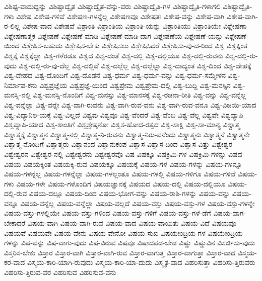 {ವಿಶಿಷ್ಟ-ವಾದುದ್ದನ್ನು
ವಿಶಿಷ್ಟಾದ್ವೈತ
ವಿಶಿಷ್ಟಾದ್ವೈತ-ವೆನ್ನು-ವರು
ವಿಶಿಷ್ಟಾದ್ವೈತಿ-ಗಳ
ವಿಶಿಷ್ಟಾದ್ವೈತಿ-ಗಳಾಗಲಿ
ವಿಶಿಷ್ಟಾದ್ವೈತಿ-ಗಳು
ವಿಶೇಷ
ವಿಶೇಷ-ಗಳಿವೆ
ವಿಶೇಷಣ-ಗಳನ್ನೆಲ್ಲ
ವಿಶೇಷಣವೂ
ವಿಶೇಷತಃ
ವಿಶೇಷ-ವನ್ನು
ವಿಶೇಷ-ವಾಗಿ
ವಿಶೇಷ-ವಾಗಿ-ರ-ಲಿಲ್ಲ
ವಿಶೇಷ-ವಾದ
ವಿಶೇಷವೆ
ವಿಶ್ರಾಂತಿ
ವಿಶ್ರಾಂತಿಯ
ವಿಶ್ರಾಂತಿ-ಯನ್ನು
ವಿಶ್ರಾಂತಿಯು
ವಿಶ್ರಾಂತಿಯೇ
ವಿಶ್ಲೇಷಣಾ
ವಿಶ್ಲೇಷಣಾತ್ಮಕ
ವಿಶ್ಲೇಷಣೆ
ವಿಶ್ಲೇಷಣೆ-ಮಾಡಿ
ವಿಶ್ಲೇಷಣೆ-ಮಾಡಿ-ದಾಗ
ವಿಶ್ಲೇಷಣೆಯ
ವಿಶ್ಲೇಷಣೆ-ಯನ್ನು
ವಿಶ್ಲೇಷಣೆ-ಯಿಂದ
ವಿಶ್ಲೇಷಿಸ-ಬಹುದು
ವಿಶ್ಲೇಷಿಸ-ಬೇಕು
ವಿಶ್ಲೇಷಿಸಲು
ವಿಶ್ಲೇಷಿಸಿದರೆ
ವಿಶ್ಲೇಷಿಸು-ವು-ದ-ರಿಂದ
ವಿಶ್ವ
ವಿಶ್ವಕ್ಕಿಂತ
ವಿಶ್ವಕ್ಕೆ
ವಿಶ್ವಕ್ಕೆಲ್ಲಾ
ವಿಶ್ವ-ಗಳೆರಡೂ
ವಿಶ್ವದ
ವಿಶ್ವ-ದಂತೆ
ವಿಶ್ವ-ದಲ್ಲಿ
ವಿಶ್ವ-ದಲ್ಲಿಯೂ
ವಿಶ್ವ-ದಲ್ಲಿ-ರುವನು
ವಿಶ್ವ-ದಲ್ಲಿ-ರು-ವುದು
ವಿಶ್ವ-ದಲ್ಲಿ-ರು-ವು-ದೆಲ್ಲ
ವಿಶ್ವ-ದಲ್ಲಿವೆ
ವಿಶ್ವ-ದಲ್ಲೆಲ್ಲ
ವಿಶ್ವ-ದಲ್ಲೆಲ್ಲಾ
ವಿಶ್ವ-ದಾದ್ಯಂತ
ವಿಶ್ವ-ದಿಂದ
ವಿಶ್ವ-ದೇಹಕ್ಕೆ
ವಿಶ್ವ-ದೇಹದ
ವಿಶ್ವ-ದೊಂದಿಗೆ
ವಿಶ್ವ-ದೊಡನೆ
ವಿಶ್ವ-ಧರ್ಮ
ವಿಶ್ವ-ಧರ್ಮ-ವನ್ನು
ವಿಶ್ವ-ಧರ್ಮ-ಸಮ್ಮೇಳನ
ವಿಶ್ವ-ನಿರ್ಮಾಪ-ಕನು
ವಿಶ್ವಪ್ರಜ್ಞೆಯ
ವಿಶ್ವಪ್ರಜ್ಞೆ-ಯಿಂದ
ವಿಶ್ವಪ್ರೇಮ
ವಿಶ್ವಪ್ರೇಮ-ದಲ್ಲಿ
ವಿಶ್ವ-ಬುದ್ದಿ
ವಿಶ್ವ-ಮನಸ್ಸಿನ
ವಿಶ್ವ-ಮನಸ್ಸಿ-ನಲ್ಲಿ
ವಿಶ್ವ-ಮನಸ್ಸಿ-ನೊಂದಿಗೆ
ವಿಶ್ವ-ಮನಸ್ಸು
ವಿಶ್ವ-ಮಾನಸಕ್ಕೆ
ವಿಶ್ವ-ರಚನಾ-ರೀತಿ
ವಿಶ್ವ-ವನ್ನು
ವಿಶ್ವ-ವನ್ನೆಲ್ಲ
ವಿಶ್ವ-ವನ್ನೆಲ್ಲಾ
ವಿಶ್ವ-ವನ್ನೇ
ವಿಶ್ವ-ವಾಗಿ-ರುವನು
ವಿಶ್ವ-ವಾಗಿ-ರುವ-ವನು
ವಿಶ್ವ-ವಾಗಿ-ರುವ-ವನೂ
ವಿಶ್ವ-ವಿಜಯಿ-ಯಾದ
ವಿಶ್ವ-ವಿದ್ಯಾನಿಲ-ಯಕ್ಕೆ
ವಿಶ್ವ-ವಿಲ್ಲದೆ
ವಿಶ್ವವು
ವಿಶ್ವವೂ
ವಿಶ್ವ-ವೆಂದರೆ
ವಿಶ್ವ-ವೆಂಬ
ವಿಶ್ವ-ವೆಲ್ಲ
ವಿಶ್ವವೇ
ವಿಶ್ವವ್ಯಾಪಿ
ವಿಶ್ವವ್ಯಾಪಿ-ಯಾದ
ವಿಶ್ವ-ಶಾಂತಿಗೆ
ವಿಶ್ವಶ್ರೇಷ್ಠನೋ
ವಿಶ್ವಸ-ಹೋದ-ರತ್ವದ
ವಿಶ್ವ-ಸಾಕ್ಷಿ
ವಿಶ್ವ-ಸಾ-ಮಾನ್ಯ
ವಿಶ್ವಾತ್ಮ
ವಿಶ್ವಾತ್ಮಕ್ಕೆ
ವಿಶ್ವಾತ್ಮನ
ವಿಶ್ವಾತ್ಮ-ನಲ್ಲಿ
ವಿಶ್ವಾತ್ಮ-ನಿ-ರುವನು
ವಿಶ್ವಾತ್ಮ-ನಿರು-ವನೆಂದು
ವಿಶ್ವಾತ್ಮನು
ವಿಶ್ವಾತ್ಮನೆ
ವಿಶ್ವಾತ್ಮನೇ
ವಿಶ್ವಾತ್ಮ-ನೊಂದಿಗೆ
ವಿಶ್ವಾತ್ಮರು
ವಿಶ್ವಾನಂದ
ವಿಶ್ವಾನುಕಂಪ
ವಿಶ್ವಾಸ
ವಿಶ್ವಾಸ-ದಿಂದ
ವಿಶ್ವಾಸ-ವಿತ್ತು
ವಿಶ್ವೇಶ್ವರ
ವಿಶ್ವೇಶ್ವರನ
ವಿಶ್ವೇಶ್ವರ-ನಲ್ಲಿ
ವಿಶ್ವೇಶ್ವರನು
ವಿಶ್ವೇಶ್ವರವೊ
ವಿಷ
ವಿಷಕ್ಕೂ
ವಿಷಕ್ರಿಮಿ-ಗಳ
ವಿಷಕ್ರಿಮಿ-ಗಳನ್ನು
ವಿಷದ
ವಿಷಯ
ವಿಷಯಕ್ಕಿಂತ
ವಿಷಯಕ್ಕಿ-ರುವ
ವಿಷಯಕ್ಕೂ
ವಿಷಯಕ್ಕೆ
ವಿಷಯ-ಗಳ
ವಿಷಯ-ಗಳನ್ನು
ವಿಷಯ-ಗಳನ್ನೂ
ವಿಷಯ-ಗಳನ್ನೆಲ್ಲ
ವಿಷಯ-ಗಳನ್ನೆಲ್ಲಾ
ವಿಷಯ-ಗಳಲ್ಲಂತೂ
ವಿಷಯ-ಗಳಲ್ಲಿ
ವಿಷಯ-ಗಳಿಗೂ
ವಿಷಯ-ಗಳಿವೆ
ವಿಷಯ-ಗಳು
ವಿಷಯ-ಗಳೇ
ವಿಷಯ-ಗಳೊಂದಿಗೆ
ವಿಷಯಜ್ಞಾನಕ್ಕೆ
ವಿಷಯದ
ವಿಷಯ-ದಲ್ಲಿ
ವಿಷಯ-ದಲ್ಲಿಯೂ
ವಿಷಯ-ದಲ್ಲಿ-ರುವ
ವಿಷಯ-ದಲ್ಲೂ
ವಿಷಯ-ದಿಂದ
ವಿಷಯ-ಭೋಗ-ವನ್ನು
ವಿಷಯ-ರಾಶಿ-ಗಳನ್ನು
ವಿಷಯ-ವನ್ನು
ವಿಷಯ-ವನ್ನೂ
ವಿಷಯ-ವನ್ನೆಲ್ಲ
ವಿಷಯ-ವನ್ನೆಲ್ಲಾ
ವಿಷಯ-ವಲ್ಲದೆ
ವಿಷಯ-ವಸ್ತು
ವಿಷಯ-ವಸ್ತು-ಗಳ
ವಿಷಯ-ವಸ್ತು-ಗಳನ್ನೇ
ವಿಷಯ-ವಸ್ತು-ಗಳಲ್ಲಿಯೇ
ವಿಷಯ-ವಸ್ತು-ಗಳಿಂದ
ವಿಷಯ-ವಸ್ತು-ಗಳಿಗೆ
ವಿಷಯ-ವಸ್ತು-ಗಳೆ-ಡೆಗೆ
ವಿಷಯ-ವಾಗ-ಬೇಕಾದರೆ
ವಿಷಯ-ವಾಗಿ
ವಿಷಯ-ವಾಗಿ-ರುವ
ವಿಷಯ-ವಾದ
ವಿಷಯ-ವಾಯಿತು
ವಿಷಯ-ವಿದೆ
ವಿಷಯವೂ
ವಿಷಯವೆ
ವಿಷಯವೇ
ವಿಷಯ-ವೇನು
ವಿಷಯ-ವೇನೋ
ವಿಷಯ-ಸುಖ
ವಿಷಯೇಂದ್ರಿಯ-ಗಳ
ವಿಷಯೇಂದ್ರಿಯ-ಗಳನ್ನು
ವಿಷ-ವನ್ನು
ವಿಷ-ವಾಗು-ವುದು
ವಿಷ-ವಿರುವ
ವಿಷವೂ
ವಿಷಾದಪಡ-ಬೇಡ
ವಿಷ್ಣು
ವಿಷ್ಣುವಿನ
ವಿಸರ್ಜಿಸು-ವುದು
ವಿಸ್ತರಿಸ-ಬೇಕು
ವಿಸ್ತಾರ
ವಿಸ್ತಾರ-ವಾಗಿ
ವಿಸ್ತಾರ-ವಾಗಿ-ರುವ
ವಿಸ್ತಾರ-ವಾಗುತ್ತ
ವಿಸ್ತಾರ-ವಾಗುತ್ತಾ
ವಿಸ್ತಾರ-ವಾದ
ವಿಸ್ಮಯ-ಕರ-ವಾದ
ವಿಸ್ಮಯ-ಕಾರಿ-ಯಾಗಿ-ರುವುದು
ವಿಸ್ಮಯ-ಕಾರಿ-ಯಾ-ದುದು
ವಿಸ್ಮೃತ-ವಾದ
ವಿಹರಿಸುತ್ತಾ
ವಿಹರಿಸು-ತ್ತಿರುವರು
ವಿಹರಿಸು-ತ್ತಿರುವ-ವರ
ವಿಹರಿಸುವ
ವಿಹರಿಸುವ-ವನು
}
